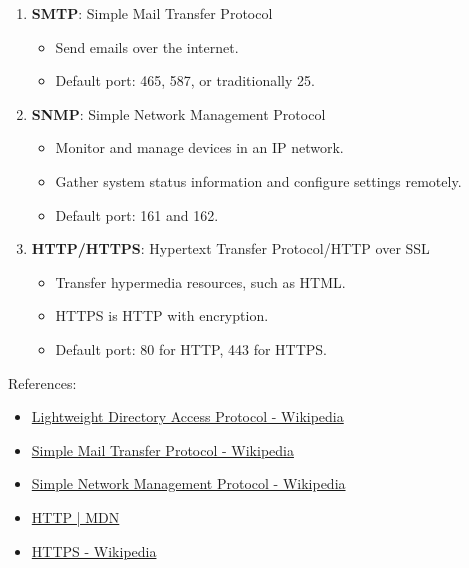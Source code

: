 \documentclass[12pt, a4paper]{article}
\begin{document}
\begin{enumerate}
\begin{enumerate}
      \item \textbf{SMTP}: Simple Mail Transfer Protocol
      \begin{itemize}
        \item Send emails over the internet.
        \item Default port: 465, 587, or traditionally 25.
      \end{itemize}

      \item \textbf{SNMP}: Simple Network Management Protocol
      \begin{itemize}
        \item Monitor and manage devices in an IP network.
        \item Gather system status information and configure settings remotely.
        \item Default port: 161 and 162.
      \end{itemize}

       \item \textbf{HTTP/HTTPS}: Hypertext Transfer Protocol/HTTP over SSL
       \begin{itemize}
         \item Transfer hypermedia resources, such as HTML.
         \item HTTPS is HTTP with encryption.
         \item Default port: 80 for HTTP, 443 for HTTPS.
       \end{itemize}
    \end{enumerate}
    References:
    \begin{itemize}
      \item \href{https://en.wikipedia.org/wiki/Lightweight_Directory_Access_Protocol}{Lightweight Directory Access Protocol - Wikipedia}
      \item \href{https://en.wikipedia.org/wiki/Simple_Mail_Transfer_Protocol}{Simple Mail Transfer Protocol - Wikipedia}
      \item \href{https://en.wikipedia.org/wiki/Simple_Network_Management_Protocol}{Simple Network Management Protocol - Wikipedia}
      \item \href{https://developer.mozilla.org/en-US/docs/Web/HTTP}{HTTP | MDN}
      \item \href{https://en.wikipedia.org/wiki/HTTPS}{HTTPS - Wikipedia}
    \end{itemize}
  \end{enumerate}
\end{document}

